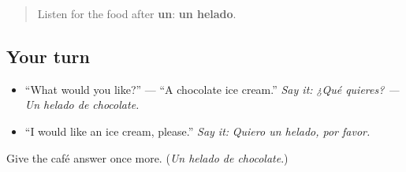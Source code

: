 \begin{quote}
Listen for the food after \textbf{un}: \textbf{un helado}.
\end{quote}

\subsection*{Your turn}
\begin{itemize}
\raggedright
  \item “What would you like?” — “A chocolate ice cream.” \emph{Say it:} \emph{¿Qué quieres? — Un helado de chocolate.}
  \item “I would like an ice cream, please.” \emph{Say it:} \emph{Quiero un helado, por favor.}
\end{itemize}

\begin{tcolorbox}[breakable,colback=teal!4,colframe=teal!35!black,title={Before you move on}]
Give the café answer once more. (\emph{Un helado de chocolate}.)
\end{tcolorbox}
